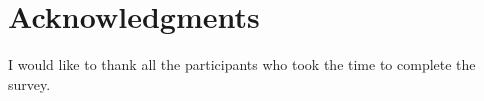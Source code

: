 \documentclass[12pt,a4paper]{article}
\begin{document}

    \section*{Acknowledgments}
    I would like to thank all the participants who took the time to complete the survey.
    \clearpage

    \tableofcontents
    \clearpage

    \listoffigures
    \clearpage

    \listoftables
    \clearpage

    
    \clearpage


    \pagestyle{main}

    
\end{document}
